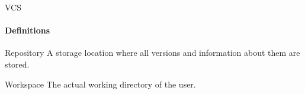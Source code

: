 \documentclass[aspectratio=169]{beamer}
\newcommand{\cmark}{\ding{51}}%
\newcommand{\xmark}{\ding{55}}%
\begin{document}



%
%

\begin{frame}{VCS}
    \framesubtitle{Definitions}
    
    \begin{block}{Repository}
    	A storage location where all versions and information about them are stored.
    \end{block}

	\begin{block}{Workspace}
		The actual working directory of the user.
	\end{block}
\end{frame}
\end{document}
